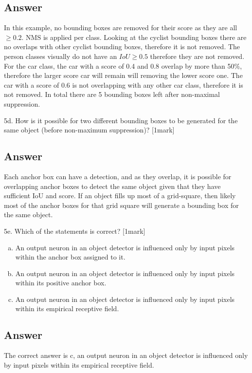 \documentclass[
	12pt, %
]{fphw}
\begin{document}
\subsection*{Answer}
In this example, no bounding boxes are removed for their score as they are all $\ge 0.2$.
NMS is applied per class. Looking at the cyclist bounding boxes there are no overlaps with other cyclist bounding boxes, therefore it is not removed. The person classes visually do not have an $IoU \ge 0.5$ therefore they are not removed. For the car class, the car with a score of 0.4 and 0.8 overlap by more than 50\%, therefore the larger score car will remain will removing the lower score one. The car with a score of 0.6 is not overlapping with any other car class, therefore it is not removed. In total there are 5 bounding boxes left after non-maximal suppression.
\begin{problem}
5d. How is it possible for two different bounding boxes to be generated for the same
object (before non-maximum suppression)? [1mark]
\end{problem}
\subsection*{Answer}
Each anchor box can have a detection, and as they overlap, it is possible for overlapping anchor boxes to detect the same object given that they have sufficient IoU and score. If an object fills up most of a grid-square, then likely most of the anchor boxes for that grid square will generate a bounding box for the same object.
\begin{problem}
5e. Which of the statements is correct? [1mark]
\begin{enumerate}[a)] 
	\item An output neuron in an object detector is influenced only by input pixels within
	      the anchor box assigned to it.
	\item An output neuron in an object detector is influenced only by input pixels within
	      its positive anchor box.
	\item An output neuron in an object detector is influenced only by input pixels within
	      its empirical receptive field.
\end{enumerate}
\end{problem}
\subsection*{Answer}
The correct answer is c, an output neuron in an object detector is influenced only by input pixels within its empirical receptive field.
\end{document}
